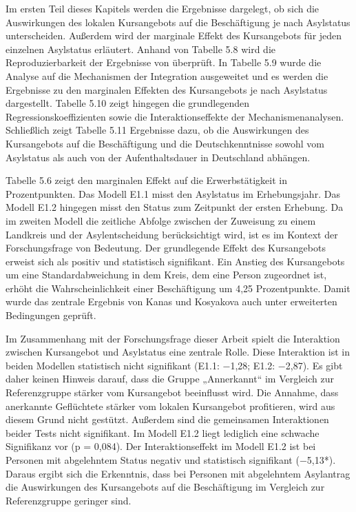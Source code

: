 Im ersten Teil dieses Kapitels werden die Ergebnisse dargelegt, ob sich die Auswirkungen des lokalen Kursangebots auf die Beschäftigung je nach Asylstatus unterscheiden. Außerdem wird der marginale Effekt des Kursangebots für jeden einzelnen Asylstatus erläutert. Anhand von Tabelle 5.8 wird die Reproduzierbarkeit der Ergebnisse von \textcite{Kanas:2023} überprüft. In Tabelle 5.9 wurde die Analyse auf die Mechanismen der Integration ausgeweitet und es werden die Ergebnisse zu den marginalen Effekten des Kursangebots je nach Asylstatus dargestellt. Tabelle 5.10 zeigt hingegen die grundlegenden Regressionskoeffizienten sowie die Interaktionseffekte der Mechanismenanalysen. Schließlich zeigt Tabelle 5.11 Ergebnisse dazu, ob die Auswirkungen des Kursangebots auf die Beschäftigung und die Deutschkenntnisse sowohl vom Asylstatus als auch von der Aufenthaltsdauer in Deutschland abhängen.

Tabelle 5.6 zeigt den marginalen Effekt auf die Erwerbstätigkeit in Prozentpunkten. Das Modell E1.1 misst den Asylstatus im Erhebungsjahr. Das Modell E1.2 hingegen misst den Status zum Zeitpunkt der ersten Erhebung. Da im zweiten Modell die zeitliche Abfolge zwischen der Zuweisung zu einem Landkreis und der Asylentscheidung berücksichtigt wird, ist es im Kontext der Forschungsfrage von Bedeutung. Der grundlegende Effekt des Kursangebots erweist sich als positiv und statistisch signifikant. Ein Anstieg des Kursangebots um eine Standardabweichung in dem Kreis, dem eine Person zugeordnet ist, erhöht die Wahrscheinlichkeit einer Beschäftigung um 4,25 Prozentpunkte. Damit wurde das zentrale Ergebnis von Kanas und Kosyakova auch unter erweiterten Bedingungen geprüft.

Im Zusammenhang mit der Forschungsfrage dieser Arbeit spielt die Interaktion zwischen Kursangebot und Asylstatus eine zentrale Rolle. Diese Interaktion ist in beiden Modellen statistisch nicht signifikant (E1.1: −1,28; E1.2: −2,87). Es gibt daher keinen Hinweis darauf, dass die Gruppe „Annerkannt“ im Vergleich zur Referenzgruppe stärker vom Kursangebot beeinflusst wird. Die Annahme, dass anerkannte Geflüchtete stärker vom lokalen Kursangebot profitieren, wird aus diesem Grund nicht gestützt. Außerdem sind die gemeinsamen Interaktionen beider Tests nicht signifikant. Im Modell E1.2 liegt lediglich eine schwache Signifikanz vor (p = 0,084). Der Interaktionseffekt im Modell E1.2 ist bei Personen mit abgelehntem Status negativ und statistisch signifikant (−5,13*). Daraus ergibt sich die Erkenntnis, dass bei Personen mit abgelehntem Asylantrag die Auswirkungen des Kursangebots auf die Beschäftigung im Vergleich zur Referenzgruppe geringer sind.

